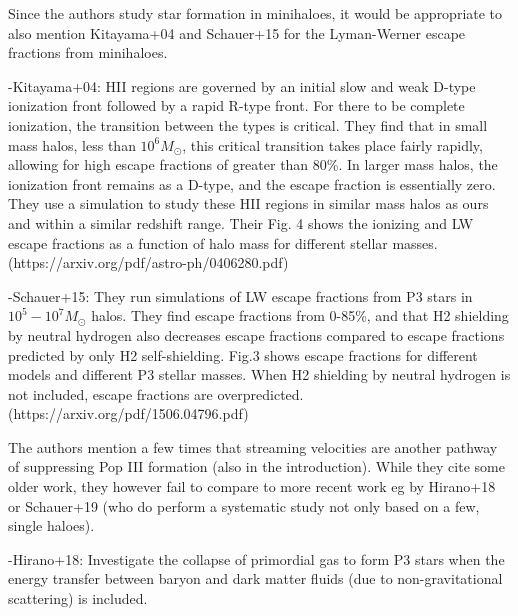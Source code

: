 \documentclass[11pt]{article}
\newenvironment{referee}[1][]{%
    \ignorespaces%
    \begin{mdframed}[style=myquotestyle,#1]%
}{%
    \end{mdframed}%
    \ignorespacesafterend%
}%
\begin{document}
\begin{referee}
Since the authors study star formation in minihaloes, it would be appropriate to also mention Kitayama+04 and Schauer+15 for the Lyman-Werner escape fractions from minihaloes.
\end{referee}
-Kitayama+04: HII regions are governed by an initial slow and weak D-type ionization front followed by a rapid R-type front. For there to be complete ionization, the transition between the types is critical. They find that in small mass halos, less than $10^6 M_{\odot}$, this critical transition takes place fairly rapidly, allowing for high escape fractions of greater than 80\%. In larger mass halos, the ionization front remains as a D-type, and the escape fraction is essentially zero. They use a simulation to study these HII regions in similar mass halos as ours and within a similar redshift range. Their Fig. 4 shows the ionizing and LW escape fractions as a function of halo mass for different stellar masses. (https://arxiv.org/pdf/astro-ph/0406280.pdf)

-Schauer+15: They run simulations of LW escape fractions from P3 stars in $10^5 - 10^7 M_{\odot}$ halos. They find escape fractions from 0-85\%, and that H2 shielding by neutral hydrogen also decreases escape fractions compared to escape fractions predicted by only H2 self-shielding. Fig.3 shows escape fractions for different models and different P3 stellar masses. When H2 shielding by neutral hydrogen is not included, escape fractions are overpredicted. (https://arxiv.org/pdf/1506.04796.pdf)

\begin{referee}
The authors mention a few times that streaming velocities are another pathway of suppressing Pop III formation (also in the introduction). While they cite some older work, they however fail to compare to more recent work eg by Hirano+18 or Schauer+19 (who do perform a systematic study not only based on a few, single haloes).
\end{referee}
-Hirano+18: Investigate the collapse of primordial gas to form P3 stars when the energy transfer between baryon and dark matter fluids (due to non-gravitational scattering) is included.
\end{document}
